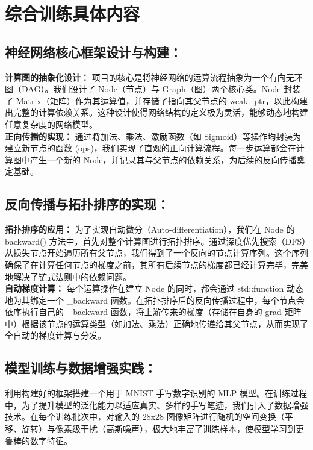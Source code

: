 \documentclass{ctexart} %
\begin{document}
\section{综合训练具体内容}

\subsection{神经网络核心框架设计与构建：}

\textbf{计算图的抽象化设计：} 项目的核心是将神经网络的运算流程抽象为一个有向无环图（DAG）。我们设计了 Node（节点）与 Graph（图）两个核心类。Node 封装了 Matrix（矩阵）作为其运算值，并存储了指向其父节点的 weak\_ptr，以此构建出完整的计算依赖关系。这种设计使得网络结构的定义极为灵活，能够动态地构建任意复杂度的网络模型。\\
\textbf{正向传播的实现：} 通过将加法、乘法、激励函数（如 Sigmoid）等操作均封装为建立新节点的函数 (ops)，我们实现了直观的正向计算流程。每一步运算都会在计算图中产生一个新的 Node，并记录其与父节点的依赖关系，为后续的反向传播奠定基础。\\

\subsection{反向传播与拓扑排序的实现：}

\textbf{拓扑排序的应用：} 为了实现自动微分（Auto-differentiation），我们在 Node 的 backward() 方法中，首先对整个计算图进行拓扑排序。通过深度优先搜索（DFS）从损失节点开始遍历所有父节点，我们得到了一个反向的节点计算序列。这个序列确保了在计算任何节点的梯度之前，其所有后续节点的梯度都已经计算完毕，完美地解决了链式法则中的依赖问题。\\
\textbf{自动梯度计算：} 每个运算操作在建立 Node 的同时，都会通过 std::function 动态地为其绑定一个 \_backward 函数。在拓扑排序后的反向传播过程中，每个节点会依序执行自己的 \_backward 函数，将上游传来的梯度（存储在自身的 grad 矩阵中）根据该节点的运算类型（如加法、乘法）正确地传递给其父节点，从而实现了全自动的梯度计算与分发。\\

\subsection{模型训练与数据增强实践：}

利用构建好的框架搭建一个用于 MNIST 手写数字识别的 MLP 模型。在训练过程中，为了提升模型的泛化能力以适应真实、多样的手写笔迹，我们引入了数据增强技术。在每个训练批次中，对输入的 28x28 图像矩阵进行随机的空间变换（平移、旋转）与像素级干扰（高斯噪声），极大地丰富了训练样本，使模型学习到更鲁棒的数字特征。\\
\end{document}
